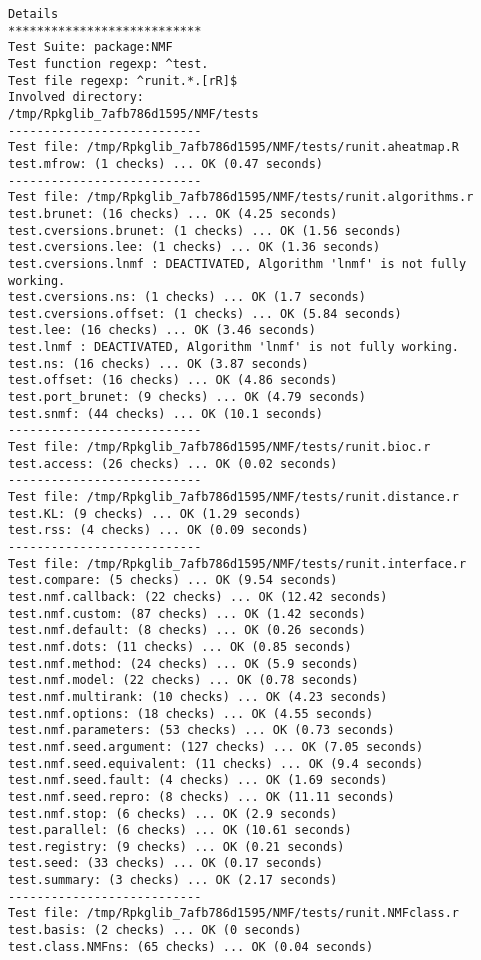 \documentclass[10pt]{article}
\begin{document}
\begin{verbatim}
Details 
*************************** 
Test Suite: package:NMF 
Test function regexp: ^test. 
Test file regexp: ^runit.*.[rR]$ 
Involved directory: 
/tmp/Rpkglib_7afb786d1595/NMF/tests 
--------------------------- 
Test file: /tmp/Rpkglib_7afb786d1595/NMF/tests/runit.aheatmap.R 
test.mfrow: (1 checks) ... OK (0.47 seconds)
--------------------------- 
Test file: /tmp/Rpkglib_7afb786d1595/NMF/tests/runit.algorithms.r 
test.brunet: (16 checks) ... OK (4.25 seconds)
test.cversions.brunet: (1 checks) ... OK (1.56 seconds)
test.cversions.lee: (1 checks) ... OK (1.36 seconds)
test.cversions.lnmf : DEACTIVATED, Algorithm 'lnmf' is not fully working.
test.cversions.ns: (1 checks) ... OK (1.7 seconds)
test.cversions.offset: (1 checks) ... OK (5.84 seconds)
test.lee: (16 checks) ... OK (3.46 seconds)
test.lnmf : DEACTIVATED, Algorithm 'lnmf' is not fully working.
test.ns: (16 checks) ... OK (3.87 seconds)
test.offset: (16 checks) ... OK (4.86 seconds)
test.port_brunet: (9 checks) ... OK (4.79 seconds)
test.snmf: (44 checks) ... OK (10.1 seconds)
--------------------------- 
Test file: /tmp/Rpkglib_7afb786d1595/NMF/tests/runit.bioc.r 
test.access: (26 checks) ... OK (0.02 seconds)
--------------------------- 
Test file: /tmp/Rpkglib_7afb786d1595/NMF/tests/runit.distance.r 
test.KL: (9 checks) ... OK (1.29 seconds)
test.rss: (4 checks) ... OK (0.09 seconds)
--------------------------- 
Test file: /tmp/Rpkglib_7afb786d1595/NMF/tests/runit.interface.r 
test.compare: (5 checks) ... OK (9.54 seconds)
test.nmf.callback: (22 checks) ... OK (12.42 seconds)
test.nmf.custom: (87 checks) ... OK (1.42 seconds)
test.nmf.default: (8 checks) ... OK (0.26 seconds)
test.nmf.dots: (11 checks) ... OK (0.85 seconds)
test.nmf.method: (24 checks) ... OK (5.9 seconds)
test.nmf.model: (22 checks) ... OK (0.78 seconds)
test.nmf.multirank: (10 checks) ... OK (4.23 seconds)
test.nmf.options: (18 checks) ... OK (4.55 seconds)
test.nmf.parameters: (53 checks) ... OK (0.73 seconds)
test.nmf.seed.argument: (127 checks) ... OK (7.05 seconds)
test.nmf.seed.equivalent: (11 checks) ... OK (9.4 seconds)
test.nmf.seed.fault: (4 checks) ... OK (1.69 seconds)
test.nmf.seed.repro: (8 checks) ... OK (11.11 seconds)
test.nmf.stop: (6 checks) ... OK (2.9 seconds)
test.parallel: (6 checks) ... OK (10.61 seconds)
test.registry: (9 checks) ... OK (0.21 seconds)
test.seed: (33 checks) ... OK (0.17 seconds)
test.summary: (3 checks) ... OK (2.17 seconds)
--------------------------- 
Test file: /tmp/Rpkglib_7afb786d1595/NMF/tests/runit.NMFclass.r 
test.basis: (2 checks) ... OK (0 seconds)
test.class.NMFns: (65 checks) ... OK (0.04 seconds)

\end{verbatim}
\end{document}
